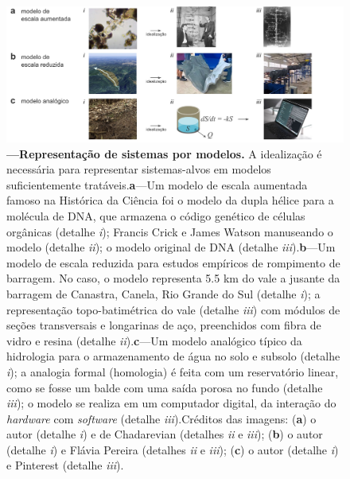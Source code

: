 \documentclass[./main.tex]{subfiles}
\begin{document}
\begin{figure}[t!] %
	\centering				
	\includegraphics[width=0.95\linewidth]{figs/fig_representation.jpg}		
	\caption[Representação de sistemas por modelos]
	{\textbf{---\;Representação de sistemas por modelos.}
        A idealização é necessária para representar sistemas-alvos em modelos suficientemente tratáveis.\;\textbf{a}\;---\;Um modelo de escala aumentada famoso na Histórica da Ciência foi o modelo da dupla hélice para a molécula de DNA, que armazena o código genético de células orgânicas (detalhe \textrm{\textit{i}}); Francis Crick e James Watson manuseando o modelo (detalhe \textrm{\textit{ii}}); o modelo original de DNA (detalhe \textrm{\textit{iii}}).\;\textbf{b}\;---\;Um modelo de escala reduzida para estudos empíricos de rompimento de barragem. No caso, o modelo representa 5.5 km do vale a jusante da barragem de Canastra, Canela, Rio Grande do Sul (detalhe \textrm{\textit{i}}); a representação topo-batimétrica do vale (detalhe \textrm{\textit{iii}}) com módulos de seções transversais e longarinas de aço, preenchidos com fibra de vidro e resina (detalhe \textrm{\textit{ii}}).\;\textbf{c}\;---\;Um modelo analógico típico da hidrologia para o armazenamento de água no solo e subsolo (detalhe \textrm{\textit{i}}); a analogia formal (homologia) é feita com um reservatório linear, como se fosse um balde com uma saída porosa no fundo (detalhe \textrm{\textit{iii}}); o modelo se realiza em um computador digital, da interação do \textit{hardware} com \textit{software} (detalhe \textrm{\textit{iii}}).\;Créditos das imagens: (\textbf{a}) o autor (detalhe \textrm{\textit{i}}) e de Chadarevian \cite{deChadarevian2003} (detalhes \textrm{\textit{ii}} e \textrm{\textit{iii}}); (\textbf{b}) o autor (detalhe \textrm{\textit{i}}) e Flávia Pereira \cite{Pereira2023} (detalhes \textrm{\textit{ii}} e \textrm{\textit{iii}}); (\textbf{c}) o autor (detalhe \textrm{\textit{i}}) e Pinterest (detalhe \textrm{\textit{iii}}).
	}
\label{fig:sys:represen}  %
\end{figure}
\end{document}
